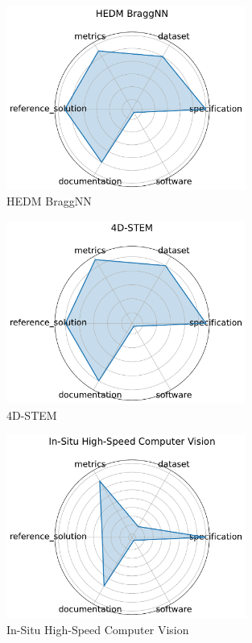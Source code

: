 \documentclass{article}
\begin{document}
\begin{figure}[h!]
  \centering
  \includegraphics[width=0.7\textwidth]{HEDM BraggNN_radar.pdf}
  \caption{HEDM BraggNN \cite{liu2021braggnnfastxraybragg}}
\end{figure}

                \begin{figure}[h!]
                  \centering
                  \includegraphics[width=0.7\textwidth]{4D-STEM_radar.pdf}
                  \caption{4D-STEM \cite{
qin2023extremely}}
                \end{figure}

\begin{figure}[h!]
  \centering
  \includegraphics[width=0.7\textwidth]{In-Situ High-Speed Computer Vision_radar.pdf}
  \caption{In-Situ High-Speed Computer Vision \cite{wei2024}}
\end{figure}
\end{document}
